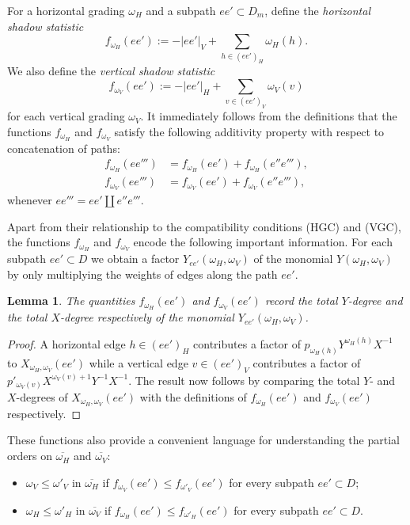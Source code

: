 \documentclass{amsart}
\newtheorem{lemma}[theorem]{Lemma}
\begin{document}
For a horizontal grading $\omega_H$ and a subpath $ee'\subset D_m$, define the \emph{horizontal shadow statistic}
\[f_{\omega_H}(ee'):=-|ee'|_V+\sum\limits_{h\in(ee')_H}\omega_H(h).\]
We also define the \emph{vertical shadow statistic}
\[f_{\omega_V}(ee'):=-|ee'|_H+\sum\limits_{v\in(ee')_V}\omega_V(v)\]
for each vertical grading $\omega_V$.  It immediately follows from the definitions that the functions $f_{\omega_H}$ and $f_{\omega_V}$ satisfy the following additivity property with respect to concatenation of paths:
\begin{align*}
  f_{\omega_H}(ee''')&=f_{\omega_H}(ee')+f_{\omega_H}(e''e'''),\\
  f_{\omega_V}(ee''')&=f_{\omega_V}(ee')+f_{\omega_V}(e''e'''),
\end{align*}
whenever $ee'''=ee'\amalg e''e'''$.

Apart from their relationship to the compatibility conditions (HGC) and (VGC), the functions $f_{\omega_H}$ and $f_{\omega_V}$ encode the following important information.  For each subpath $ee'\subset D$ we obtain a factor $Y_{ee'}(\omega_H,\omega_V)$ of the monomial $Y(\omega_H,\omega_V)$ by only multiplying the weights of edges along the path $ee'$.
\begin{lemma}
  The quantities $f_{\omega_H}(ee')$ and $f_{\omega_V}(ee')$ record the total $Y$-degree and the total $X$-degree respectively of the monomial $Y_{ee'}(\omega_H,\omega_V)$.
\end{lemma}
\begin{proof}
  A horizontal edge $h\in(ee')_H$ contributes a factor of $p_{\omega_H(h)}Y^{\omega_H(h)}X^{-1}$ to $X_{\omega_H,\omega_V}(ee')$ while a vertical edge $v\in(ee')_V$ contributes a factor of $p'_{\omega_V(v)}X^{\omega_V(v)+1}Y^{-1}X^{-1}$.  The result now follows by comparing the total $Y$- and $X$-degrees of $X_{\omega_H,\omega_V}(ee')$ with the definitions of $f_{\omega_H}(ee')$ and $f_{\omega_V}(ee')$ respectively.
\end{proof}

These functions also provide a convenient language for understanding the partial orders on $\overline{\omega_H}$ and $\overline{\omega_V}$:
\begin{itemize}
  \item $\omega_V\le\omega'_V$ in $\overline{\omega_H}$ if $f_{\omega_V}(ee')\le f_{\omega'_V}(ee')$ for every subpath $ee'\subset D$;
  \item $\omega_H\le \omega'_H$ in $\overline{\omega_V}$ if $f_{\omega_H}(ee')\le f_{\omega'_H}(ee')$ for every subpath $ee'\subset D$.
\end{itemize}
\end{document}
